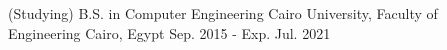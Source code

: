 

\begin{cventries}

  \cvedu
    {(Studying) B.S. in Computer Engineering} %
    {Cairo University, Faculty of Engineering} %
    {Cairo, Egypt} %
    {Sep. 2015 - Exp. Jul. 2021} %
\end{cventries}
